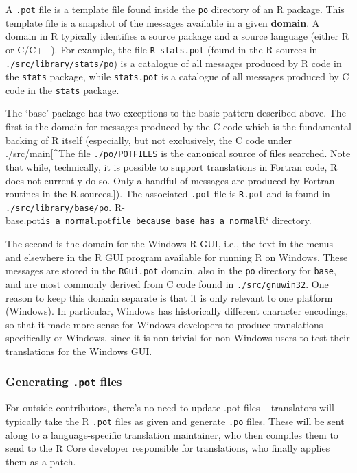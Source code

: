 \documentclass[
  letterpaper,
  DIV=11,
  numbers=noendperiod]{scrreprt}
\begin{document}
A \texttt{.pot} file is a template file found inside the \texttt{po}
directory of an R package. This template file is a snapshot of the
messages available in a given \textbf{domain}. A domain in R typically
identifies a source package and a source language (either R or C/C++).
For example, the file \texttt{R-stats.pot} (found in the R sources in
\texttt{./src/library/stats/po}) is a catalogue of all messages produced
by R code in the \texttt{stats} package, while \texttt{stats.pot} is a
catalogue of all messages produced by C code in the \texttt{stats}
package.

The `base' package has two exceptions to the basic pattern described
above. The first is the domain for messages produced by the C code which
is the fundamental backing of R itself (especially, but not exclusively,
the C code under ./src/main{[}\^{}The file \texttt{./po/POTFILES} is the
canonical source of files searched. Note that while, technically, it is
possible to support translations in Fortran code, R does not currently
do so. Only a handful of messages are produced by Fortran routines in
the R sources.{]}). The associated \texttt{.pot} file is \texttt{R.pot}
and is found in \texttt{./src/library/base/po}.
R-base.pot\texttt{is\ a\ normal}.pot\texttt{file\ because\ base\ has\ a\ normal}R`
directory.

The second is the domain for the Windows R GUI, i.e., the text in the
menus and elsewhere in the R GUI program available for running R on
Windows. These messages are stored in the \texttt{RGui.pot} domain, also
in the \texttt{po} directory for \texttt{base}, and are most commonly
derived from C code found in \texttt{./src/gnuwin32}. One reason to keep
this domain separate is that it is only relevant to one platform
(Windows). In particular, Windows has historically different character
encodings, so that it made more sense for Windows developers to produce
translations specifically or Windows, since it is non-trivial for
non-Windows users to test their translations for the Windows GUI.

\subsubsection{\texorpdfstring{Generating \texttt{.pot}
files}{Generating .pot files}}\label{generating-.pot-files}

For outside contributors, there's no need to update .pot files --
translators will typically take the R \texttt{.pot} files as given and
generate \texttt{.po} files. These will be sent along to a
language-specific translation maintainer, who then compiles them to send
to the R Core developer responsible for translations, who finally
applies them as a patch.
\end{document}

